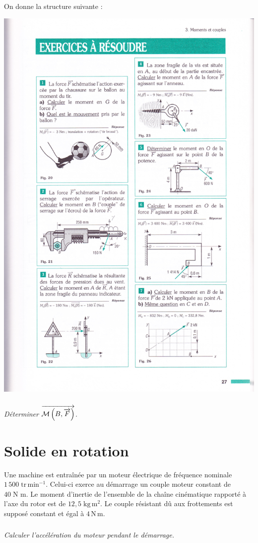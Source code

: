 \documentclass[10pt,fleqn]{article} %
\begin{document}
\begin{multicols}{2}
On donne la structure suivante : 
\begin{center}
\includegraphics[width=.8\linewidth]{images/fig_24}
\end{center}


\subparagraph{}
\textit{Déterminer $\overrightarrow{\mathcal{M}\left(B,\overrightarrow{F} \right)}$.}




\section*{Solide en rotation}
\setcounter{subparagraph}{0}
\setcounter{exo}{0}

 Une machine est entraînée par un moteur électrique de fréquence nominale $1\,500\; \text{tr}\,\text{min}^{-1}$. Celui-ci exerce au démarrage un couple moteur constant de $40\; \text{N}\,\,\text{m}$. Le moment d’inertie de l’ensemble de la chaîne cinématique rapporté à l’axe du rotor est de $12,5\; \text{kg}\,\text{m}^2$. Le couple résistant dû aux frottements est supposé constant et égal à $4\, \text{N} \, \text{m}$.

\subparagraph{}
\textit{Calculer l’accélération du moteur pendant le démarrage.}


\end{multicols}
\end{document}
